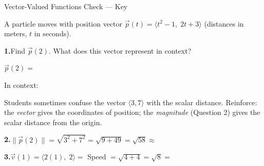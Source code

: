 \documentclass[10pt]{article}
\begin{document}
\namedateperiod

\vspace{0.12in}

\begin{notesbox}{Vector-Valued Functions Check --- Key}

A particle moves with position vector $\vec{p}(t)=\langle t^{2}-1,\;2t+3\rangle$
(distances in meters, $t$ in seconds).

\vspace{10pt}
\textbf{1.}\quad Find $\vec{p}(2)$.  What does this vector represent in context?

\vspace{6pt}
$\vec{p}(2) = $ 

\vspace{6pt}
In context: 

\begin{teachernote}
  Students sometimes confuse the vector $\langle 3,7\rangle$ with the scalar
  distance. Reinforce: the \emph{vector} gives the coordinates of position;
  the \emph{magnitude} (Question 2) gives the scalar distance from the origin.
\end{teachernote}

\vspace{12pt}
\textbf{2.}\quad $\|\vec{p}(2)\| = \sqrt{3^{2}+7^{2}} = \sqrt{9+49} = \sqrt{58} \approx $ 

\vspace{12pt}
\textbf{3.}\quad $\vec{v}(1) = \langle 2(1),\;2\rangle = $  \qquad
Speed $= \sqrt{4+4} = \sqrt{8} = $ 

\end{notesbox}
\end{document}
